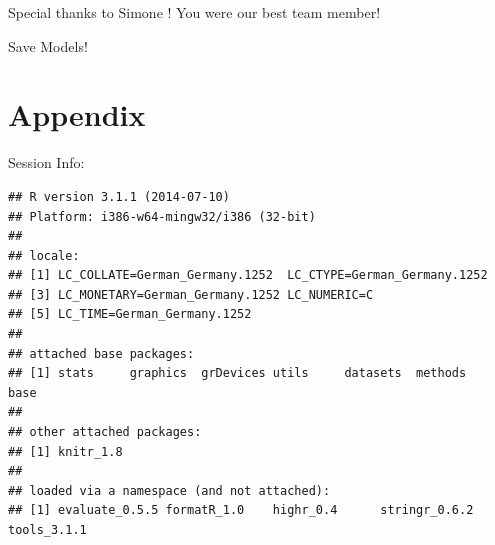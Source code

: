 \documentclass[11pt, a4paper]{article}\usepackage[]{graphicx}\usepackage[]{color}
\makeatletter
\newenvironment{kframe}{%
 \def\at@end@of@kframe{}%
 \ifinner\ifhmode%
  \def\at@end@of@kframe{\end{minipage}}%
  \begin{minipage}{\columnwidth}%
 \fi\fi%
 \def\FrameCommand##1{\hskip\@totalleftmargin \hskip-\fboxsep
 \colorbox{shadecolor}{##1}\hskip-\fboxsep
     \hskip-\linewidth \hskip-\@totalleftmargin \hskip\columnwidth}%
 \MakeFramed {\advance\hsize-\width
   \@totalleftmargin\z@ \linewidth\hsize
   \@setminipage}}%
 {\par\unskip\endMakeFramed%
 \at@end@of@kframe}
\newenvironment{knitrout}{}{} %
\makeatother
\begin{document}
Special thanks to   Simone  ! You were our best team member! 

Save Models!

\section{Appendix}

Session Info:
\begin{knitrout}
\color{fgcolor}\begin{kframe}
\begin{verbatim}
## R version 3.1.1 (2014-07-10)
## Platform: i386-w64-mingw32/i386 (32-bit)
## 
## locale:
## [1] LC_COLLATE=German_Germany.1252  LC_CTYPE=German_Germany.1252   
## [3] LC_MONETARY=German_Germany.1252 LC_NUMERIC=C                   
## [5] LC_TIME=German_Germany.1252    
## 
## attached base packages:
## [1] stats     graphics  grDevices utils     datasets  methods   base     
## 
## other attached packages:
## [1] knitr_1.8
## 
## loaded via a namespace (and not attached):
## [1] evaluate_0.5.5 formatR_1.0    highr_0.4      stringr_0.6.2  tools_3.1.1
\end{verbatim}
\end{kframe}
\end{knitrout}

{}

\end{document}
